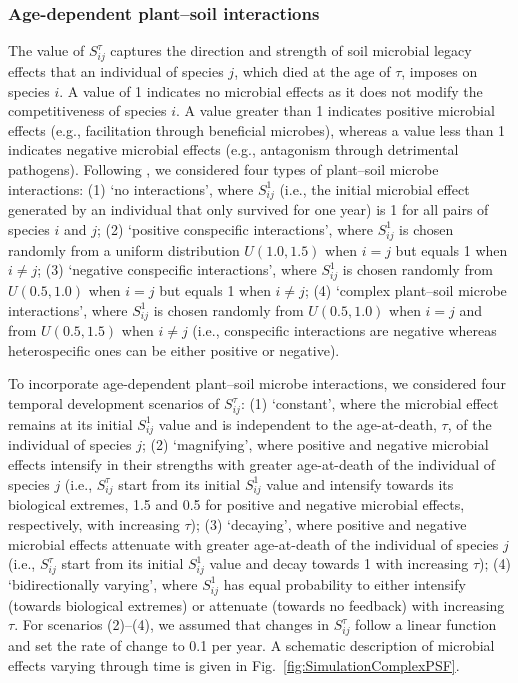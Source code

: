 \subsubsection*{Age-dependent plant--soil interactions}
The value of $S_{ij}^{\tau}$ captures the direction and strength of soil microbial legacy effects that an individual of species $j$, which died at the age of $\tau$, imposes on species $i$. A value of 1 indicates no microbial effects as it does not modify the competitiveness of species $i$. A value greater than 1 indicates positive microbial effects (e.g., facilitation through beneficial microbes), whereas a value less than 1 indicates negative microbial effects (e.g., antagonism through detrimental pathogens). Following \citet{Fukami2013}, we considered four types of plant--soil microbe interactions: 
(1) `no interactions', where $S_{ij}^{1}$ (i.e., the initial microbial effect generated by an individual that only survived for one year) is 1 for all pairs of species $i$ and $j$; 
(2) `positive conspecific interactions', where $S_{ij}^{1}$ is chosen randomly from a uniform distribution $U\left ( 1.0, 1.5 \right )$ when $i = j$ but equals 1 when $i \neq j$; 
(3) `negative conspecific interactions', where $S_{ij}^{1}$ is chosen randomly from $U\left ( 0.5, 1.0 \right )$ when $i = j$ but equals 1 when $i \neq j$; 
(4) `complex plant--soil microbe interactions', where $S_{ij}^{1}$ is chosen randomly from $U\left ( 0.5, 1.0 \right )$ when $i = j$ and from $U\left ( 0.5, 1.5 \right )$ when $i \neq j$ (i.e., conspecific interactions are negative whereas heterospecific ones can be either positive or negative).
\par


To incorporate age-dependent plant--soil microbe interactions, we considered four temporal development scenarios of $S_{ij}^{\tau}$: 
(1) `constant', where the microbial effect remains at its initial $S_{ij}^{1}$ value and is independent to the age-at-death, $\tau$, of the individual of species $j$; 
(2) `magnifying', where positive and negative microbial effects intensify in their strengths with greater age-at-death of the individual of species $j$ (i.e., $S_{ij}^{\tau}$ start from its initial $S_{ij}^{1}$ value and intensify towards its biological extremes, 1.5 and 0.5 for positive and negative microbial effects, respectively, with increasing $\tau$); 
(3) `decaying', where positive and negative microbial effects attenuate with greater age-at-death of the individual of species $j$ (i.e., $S_{ij}^{\tau}$ start from its initial $S_{ij}^{1}$ value and decay towards 1 with increasing $\tau$); 
(4) `bidirectionally varying', where $S_{ij}^{1}$ has equal probability to either intensify (towards biological extremes) or attenuate (towards no feedback) with increasing $\tau$.
For scenarios (2)--(4), we assumed that changes in $S_{ij}^{\tau}$ follow a linear function and set the rate of change to 0.1 per year. 
A schematic description of microbial effects varying through time is given in Fig.~\ref{fig:SimulationComplexPSF}.
\par


